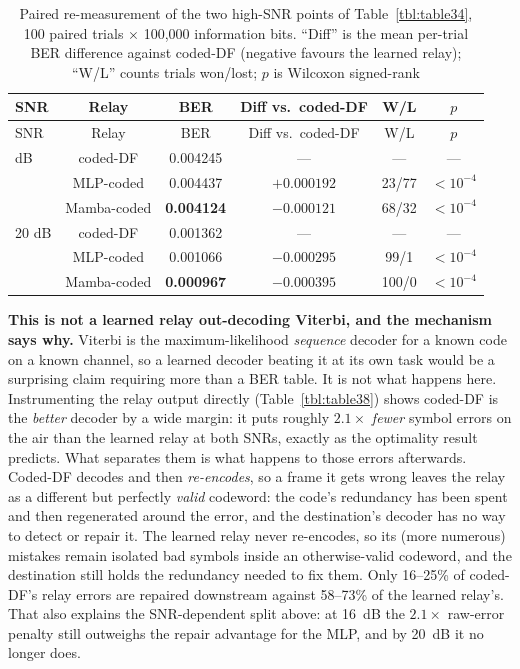 \begin{longtable}[]{@{}lccccc@{}}
\caption[Paired re-measurement of the high-SNR points]{Paired re-measurement of the two high-SNR points of Table~\ref{tbl:table34}, 100 paired trials $\times$ 100{,}000 information bits. ``Diff'' is the mean per-trial BER difference against coded-DF (negative favours the learned relay); ``W/L'' counts trials won/lost; $p$ is Wilcoxon signed-rank}\label{tbl:table37}\tabularnewline
\toprule\noalign{}
SNR & Relay & BER & Diff vs.\ coded-DF & W/L & $p$ \\
\midrule\noalign{}
\endfirsthead
\toprule\noalign{}
SNR & Relay & BER & Diff vs.\ coded-DF & W/L & $p$ \\
\midrule\noalign{}
\endhead
\bottomrule\noalign{}
\endlastfoot
16 dB & coded-DF & 0.004245 & --- & --- & --- \\
 & MLP-coded & 0.004437 & $+0.000192$ & 23/77 & $<10^{-4}$ \\
 & Mamba-coded & \textbf{0.004124} & $-0.000121$ & 68/32 & $<10^{-4}$ \\
\hline
20 dB & coded-DF & 0.001362 & --- & --- & --- \\
 & MLP-coded & 0.001066 & $-0.000295$ & 99/1 & $<10^{-4}$ \\
 & Mamba-coded & \textbf{0.000967} & $-0.000395$ & 100/0 & $<10^{-4}$ \\
\end{longtable}

\textbf{This is not a learned relay out-decoding Viterbi, and the mechanism says why.} Viterbi is the maximum-likelihood \emph{sequence} decoder for a known code on a known channel, so a learned decoder beating it at its own task would be a surprising claim requiring more than a BER table. It is not what happens here. Instrumenting the relay output directly (Table~\ref{tbl:table38}) shows coded-DF is the \emph{better} decoder by a wide margin: it puts roughly $2.1\times$ \emph{fewer} symbol errors on the air than the learned relay at both SNRs, exactly as the optimality result predicts. What separates them is what happens to those errors afterwards. Coded-DF decodes and then \emph{re-encodes}, so a frame it gets wrong leaves the relay as a different but perfectly \emph{valid} codeword: the code's redundancy has been spent and then regenerated around the error, and the destination's decoder has no way to detect or repair it. The learned relay never re-encodes, so its (more numerous) mistakes remain isolated bad symbols inside an otherwise-valid codeword, and the destination still holds the redundancy needed to fix them. Only 16--25\% of coded-DF's relay errors are repaired downstream against 58--73\% of the learned relay's. That also explains the SNR-dependent split above: at 16~dB the $2.1\times$ raw-error penalty still outweighs the repair advantage for the MLP, and by 20~dB it no longer does.

